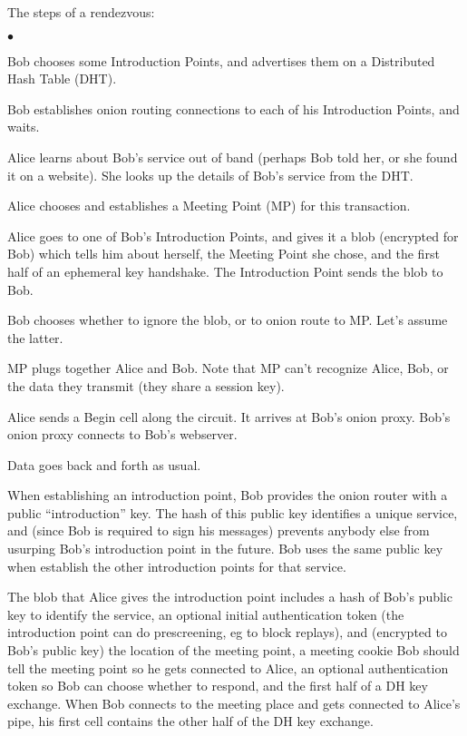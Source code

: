 \documentclass[times,10pt,twocolumn]{article}
\newenvironment{tightlist}{\begin{list}{$\bullet$}{
  \setlength{\itemsep}{0mm}
    \setlength{\parsep}{0mm}
    }}{\end{list}}
\begin{document}
The steps of a rendezvous:
\begin{tightlist}
\item Bob chooses some Introduction Points, and advertises them on a
      Distributed Hash Table (DHT).
\item Bob establishes onion routing connections to each of his
      Introduction Points, and waits.
\item Alice learns about Bob's service out of band (perhaps Bob told her,
      or she found it on a website). She looks up the details of Bob's
      service from the DHT.
\item Alice chooses and establishes a Meeting Point (MP) for this
      transaction.
\item Alice goes to one of Bob's Introduction Points, and gives it a blob
      (encrypted for Bob) which tells him about herself, the Meeting Point
      she chose, and the first half of an ephemeral key handshake. The
      Introduction Point sends the blob to Bob.
\item Bob chooses whether to ignore the blob, or to onion route to MP.
      Let's assume the latter.
\item MP plugs together Alice and Bob. Note that MP can't recognize Alice,
      Bob, or the data they transmit (they share a session key).
\item Alice sends a Begin cell along the circuit. It arrives at Bob's
      onion proxy. Bob's onion proxy connects to Bob's webserver.
\item Data goes back and forth as usual.
\end{tightlist}

When establishing an introduction point, Bob provides the onion router
with a public ``introduction'' key.  The hash of this public key
identifies a unique service, and (since Bob is required to sign his
messages) prevents anybody else from usurping Bob's introduction point
in the future. Bob uses the same public key when establish the other
introduction points for that service.

The blob that Alice gives the introduction point includes a hash of Bob's
public key to identify the service, an optional initial authentication
token (the introduction point can do prescreening, eg to block replays),
and (encrypted to Bob's public key) the location of the meeting point,
a meeting cookie Bob should tell the meeting point so he gets connected to
Alice, an optional authentication token so Bob can choose whether to respond,
and the first half of a DH key exchange. When Bob connects to the meeting
place and gets connected to Alice's pipe, his first cell contains the
other half of the DH key exchange.
\end{document}
